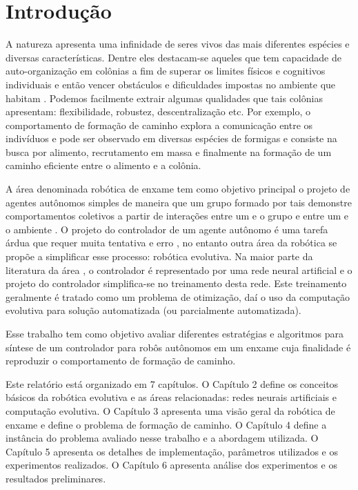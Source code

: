 \chapter{Introdução}
\label{cha:introducao}

A natureza apresenta uma infinidade de seres vivos das mais diferentes espécies e diversas características. Dentre eles destacam-se aqueles que tem capacidade de auto-organização em colônias a fim de superar os limites físicos e cognitivos individuais e então vencer obstáculos e dificuldades impostas no ambiente que habitam \cite{navarro2012introduction}. Podemos facilmente extrair algumas qualidades que tais colônias apresentam: flexibilidade, robustez, descentralização etc. Por exemplo, o comportamento de formação de caminho explora a comunicação entre os indivíduos e pode ser observado em diversas espécies de formigas e consiste na busca por alimento, recrutamento em massa e finalmente na formação de um caminho eficiente entre o alimento e a colônia.

A área denominada robótica de enxame tem como objetivo principal o projeto de agentes autônomos simples de maneira que um grupo formado por tais demonstre comportamentos coletivos a partir de interações entre um e o grupo e entre um e o ambiente \cite{sahin2005swarm}. O projeto do controlador de um agente autônomo é uma tarefa árdua que requer muita tentativa e erro \cite{nolfi1994howtoevolve}, no entanto outra área da robótica se propõe a simplificar esse processo: robótica evolutiva. Na maior parte da literatura da área \cite{nelson2009fitness}, o controlador é representado por uma rede neural artificial e o projeto do controlador simplifica-se no treinamento desta rede. Este treinamento geralmente é tratado como um problema de otimização, daí o uso da computação evolutiva para solução automatizada (ou parcialmente automatizada).

Esse trabalho tem como objetivo avaliar diferentes estratégias e algoritmos para síntese de um controlador para robôs autônomos em um enxame cuja finalidade é reproduzir o comportamento de formação de caminho.

Este relatório está organizado em 7 capítulos. O Capítulo 2 define os conceitos básicos da robótica evolutiva e as áreas relacionadas: redes neurais artificiais e computação evolutiva. O Capítulo 3 apresenta uma visão geral da robótica de enxame e define o problema de formação de caminho. O Capítulo 4 define a instância do problema avaliado nesse trabalho e a abordagem utilizada. O Capítulo 5 apresenta os detalhes de implementação, parâmetros utilizados e os experimentos realizados. O Capítulo 6 apresenta análise dos experimentos e os resultados preliminares.